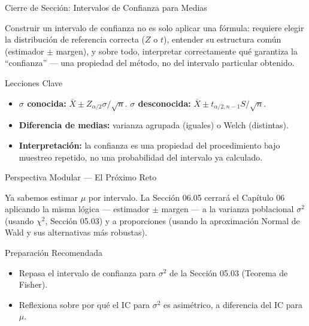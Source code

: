 \documentclass[10pt, aspectratio=169]{beamer}
\begin{document}
\begin{frame}{Cierre de Sección: Intervalos de Confianza para Medias}
  \begin{reflexion}
    Construir un intervalo de confianza no es solo aplicar una fórmula: requiere elegir la distribución de referencia correcta ($Z$ o $t$), entender su estructura común (estimador $\pm$ margen), y sobre todo, interpretar correctamente qué garantiza la ``confianza'' --- una propiedad del método, no del intervalo particular obtenido.
  \end{reflexion}

  \vspace{0.2cm}
  \pause
  \begin{block}{Lecciones Clave}
    \begin{itemize}\itemsep=0.08cm
      \item \textbf{$\sigma$ conocida:} $\bar X \pm Z_{\alpha/2}\sigma/\sqrt n$. \textbf{$\sigma$ desconocida:} $\bar X \pm t_{\alpha/2,n-1}S/\sqrt n$.
      \item \textbf{Diferencia de medias:} varianza agrupada (iguales) o Welch (distintas).
      \item \textbf{Interpretación:} la confianza es una propiedad del procedimiento bajo muestreo repetido, no una probabilidad del intervalo ya calculado.
    \end{itemize}
  \end{block}
\end{frame}

\begin{frame}{Perspectiva Modular --- El Próximo Reto}
  \scriptsize
  \begin{retoclase}
    Ya sabemos estimar $\mu$ por intervalo. La Sección 06.05 cerrará el Capítulo 06 aplicando la misma lógica --- estimador $\pm$ margen --- a la varianza poblacional $\sigma^2$ (usando $\chi^2$, Sección 05.03) y a proporciones (usando la aproximación Normal de Wald y sus alternativas más robustas).
  \end{retoclase}

  \vspace{0.08cm}
  \pause
  \begin{alertblock}{Preparación Recomendada}
    \begin{itemize}\itemsep=0.06cm
      \item Repasa el intervalo de confianza para $\sigma^2$ de la Sección 05.03 (Teorema de Fisher).
      \item Reflexiona sobre por qué el IC para $\sigma^2$ es asimétrico, a diferencia del IC para $\mu$.
    \end{itemize}
  \end{alertblock}
\end{frame}
\end{document}
